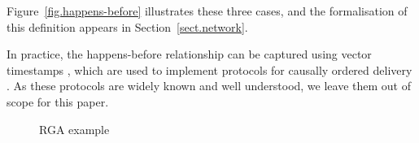 Figure~\ref{fig.happens-before} illustrates these three cases, and the formalisation of this
definition appears in Section~\ref{sect.network}.

In practice, the happens-before relationship can be captured using vector timestamps
\cite{Schwarz:1994gl,Fidge:1988tv,Raynal:1996jl}, which are used to implement protocols for causally
ordered delivery \cite{Cachin:2011wt}. As these protocols are widely known and well understood, we
leave them out of scope for this paper.









\begin{figure}
\centering

\caption{RGA example}\label{fig.two-lists}
\end{figure}



